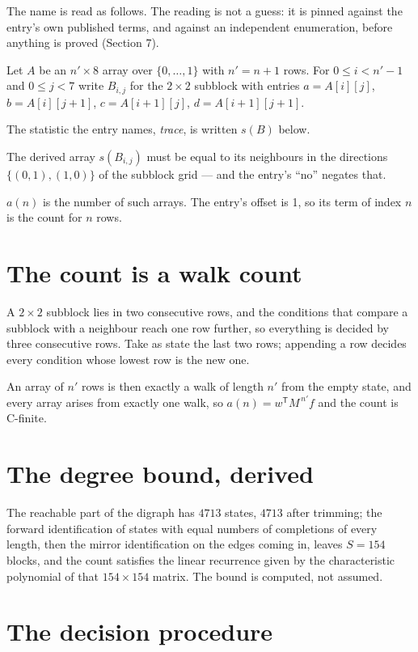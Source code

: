 \documentclass[11pt]{article}
\theoremstyle{definition}
\begin{document}
The name is read as follows. The reading is not a guess: it is pinned against the entry's own published terms, and against an independent enumeration, before anything is proved (Section 7).

Let $A$ be an $n' \times 8$ array over $\{0,\dots,1\}$ with $n' = n + 1$ rows. For $0 \le i < n'-1$ and $0 \le j < 7$ write $B_{i,j}$ for the $2\times2$ subblock with entries $a = A[i][j]$, $b = A[i][j{+}1]$, $c = A[i{+}1][j]$, $d = A[i{+}1][j{+}1]$.

The statistic the entry names, {\itshape trace}, is written $s(B)$ below.

The derived array $s(B_{i,j})$ must be equal to its neighbours in the directions $\{(0,1), (1,0)\}$ of the subblock grid --- and the entry's ``no'' negates that.

$a(n)$ is the number of such arrays. The entry's offset is 1, so its term of index $n$ is the count for $n$ rows.

\section{The count is a walk count}

A $2\times2$ subblock lies in two consecutive rows, and the conditions that compare a subblock with a neighbour reach one row further, so everything is decided by three consecutive rows. Take as state the last two rows; appending a row decides every condition whose lowest row is the new one.

An array of $n'$ rows is then exactly a walk of length $n'$ from the empty state, and every array arises from exactly one walk, so $a(n) = w^{\mathsf T}M^{\,n'}f$ and the count is C-finite.

\section{The degree bound, derived}

The reachable part of the digraph has $4713$ states, $4713$ after trimming; the forward identification of states with equal numbers of completions of every length, then the mirror identification on the edges coming in, leaves $S = 154$ blocks, and the count satisfies the linear recurrence given by the characteristic polynomial of that $154\times154$ matrix. The bound is computed, not assumed.

\section{The decision procedure}
\end{document}
